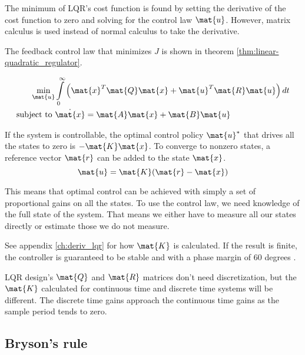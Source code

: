The minimum of LQR's cost function is found by setting the derivative of the
cost function to zero and solving for the \gls{control law} $\mat{u}$. However,
matrix calculus is used instead of normal calculus to take the derivative.

The feedback \gls{control law} that minimizes $J$ is shown in theorem
\ref{thm:linear-quadratic_regulator}.
\begin{theorem}
  \label{thm:linear-quadratic_regulator}
  \begin{align}
    \min_{\mat{u}} &\int\limits_0^\infty \left(\mat{x}^T\mat{Q}\mat{x} +
      \mat{u}^T\mat{R}\mat{u}\right) dt \nonumber \\
    \text{subject to } &\dot{\mat{x}} = \mat{A}\mat{x} + \mat{B}\mat{u}
  \end{align}

  If the \gls{system} is controllable, the optimal control policy $\mat{u}^*$
  that drives all the \glspl{state} to zero is $-\mat{K}\mat{x}$. To converge to
  nonzero \glspl{state}, a \gls{reference} vector $\mat{r}$ can be added to the
  \gls{state} $\mat{x}$.
  \begin{equation}
    \mat{u} = \mat{K}(\mat{r} - \mat{x})
  \end{equation}
\end{theorem}

This means that optimal control can be achieved with simply a set of
proportional gains on all the \glspl{state}. To use the \gls{control law}, we
need knowledge of the full \gls{state} of the \gls{system}. That means we either
have to measure all our \glspl{state} directly or estimate those we do not
measure.

See appendix \ref{ch:deriv_lqr} for how $\mat{K}$ is calculated. If the result
is finite, the controller is guaranteed to be stable and
 with a \gls{phase margin} of 60 degrees
\cite{bib:lqr_phase_margin}.
\begin{remark}
  LQR design's $\mat{Q}$ and $\mat{R}$ matrices don't need \gls{discretization},
  but the $\mat{K}$ calculated for continuous time and discrete time
  \glspl{system} will be different. The discrete time gains approach the
  continuous time gains as the sample period tends to zero.
\end{remark}

\subsection{Bryson's rule}

